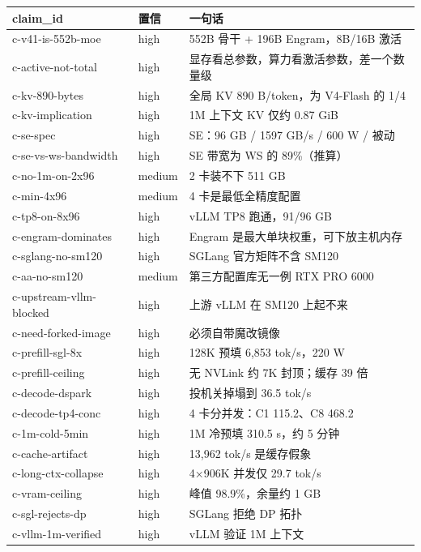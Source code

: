 \begin{table}[t]
\centering
\footnotesize
\setlength{\tabcolsep}{4pt}
\label{tab:19}
\begin{tabularx}{\textwidth}{llX}
\toprule
claim\_id & 置信 & 一句话 \\
\midrule
c-v41-is-552b-moe & high & 552B 骨干 + 196B Engram，8B/16B 激活 \\
c-active-not-total & high & 显存看总参数，算力看激活参数，差一个数量级 \\
c-kv-890-bytes & high & 全局 KV 890 B/token，为 V4-Flash 的 1/4 \\
c-kv-implication & high & 1M 上下文 KV 仅约 0.87 GiB \\
c-se-spec & high & SE：96 GB / 1597 GB/s / 600 W / 被动 \\
c-se-vs-ws-bandwidth & high & SE 带宽为 WS 的 89\%（推算） \\
c-no-1m-on-2x96 & medium & 2 卡装不下 511 GB \\
c-min-4x96 & medium & 4 卡是最低全精度配置 \\
c-tp8-on-8x96 & high & vLLM TP8 跑通，91/96 GB \\
c-engram-dominates & high & Engram 是最大单块权重，可下放主机内存 \\
c-sglang-no-sm120 & high & SGLang 官方矩阵不含 SM120 \\
c-aa-no-sm120 & medium & 第三方配置库无一例 RTX PRO 6000 \\
c-upstream-vllm-blocked & high & 上游 vLLM 在 SM120 上起不来 \\
c-need-forked-image & high & 必须自带魔改镜像 \\
c-prefill-sgl-8x & high & 128K 预填 6,853 tok/s，220 W \\
c-prefill-ceiling & high & 无 NVLink 约 7K 封顶；缓存 39 倍 \\
c-decode-dspark & high & 投机关掉塌到 36.5 tok/s \\
c-decode-tp4-conc & high & 4 卡分并发：C1 115.2、C8 468.2 \\
c-1m-cold-5min & high & 1M 冷预填 310.5 s，约 5 分钟 \\
c-cache-artifact & high & 13,962 tok/s 是缓存假象 \\
c-long-ctx-collapse & high & 4×906K 并发仅 29.7 tok/s \\
c-vram-ceiling & high & 峰值 98.9\%，余量约 1 GB \\
c-sgl-rejects-dp & high & SGLang 拒绝 DP 拓扑 \\
c-vllm-1m-verified & high & vLLM 验证 1M 上下文 \\

\end{tabularx}
\end{table}
